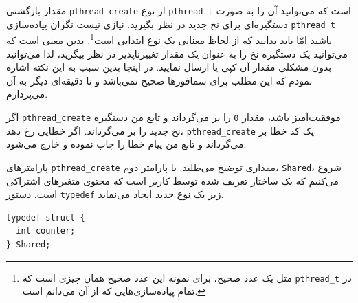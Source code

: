 \documentclass{book}
\begin{document}
    مقدار بازگشتی  {\tt pthread\_create} از نوع  {\tt pthread\_t} است که می‌توانید آن را به صورت دستگیره‌ای 
    برای نخ جدید در نظر بگیرید. نیازی نیست  نگران پیاده‌سازی {\tt pthread\_t} باشید امّا باید بدانید که از لحاظ معنایی یک نوع ابتدایی است\footnote{
    مثل یک عدد صحیح، برای نمونه این عدد صحیح همان چیزی است که  {\tt pthread\_t} در تمام پیاده‌سازی‌هایی که از آن می‌دانم است.}. 
    بدین معنی است که می‌توانید یک دستگیره نخ را به عنوان یک مقدار تغییرناپذیر در نظر بیگرید، لذا می‌توانید بدون مشکلی مقدار آن کپی یا ارسال نمایید.
    در اینجا بدین سبب به این نکته اشاره نمودم که این مطلب برای سمافورها صحیح نمی‌باشد و تا دقیقه‌ای دیگر به آن می‌پردازم. 

    اگر {\tt pthread\_create}  موفقیت‌آمیز باشد، مقدار {\tt 0}  را بر می‌گرداند و تابع من دستگیره نخ جدید را بر می‌گرداند. 
    اگر خطایی رخ دهد، {\tt pthread\_create}  یک کد خطا بر می‌گرداند و تابع من پیام خطا را چاپ نموده و خارج می‌شود. 


    
    پارامترهای {\tt pthread\_create}  مقداری توضیح می‌طلبد. با پارامتر دوم، {\tt Shared}، شروع می‌کنیم که یک ساختار تعریف شده توسط کاربر است 
    که محتوی متغیرهای اشتراکی است. دستور {\tt typedef} زیر یک نوع جدید ایجاد می‌نماید. 

\begin{latin}
\begin{lstlisting}
typedef struct {
  int counter;
} Shared;
\end{lstlisting}
\end{latin}
\end{document}
